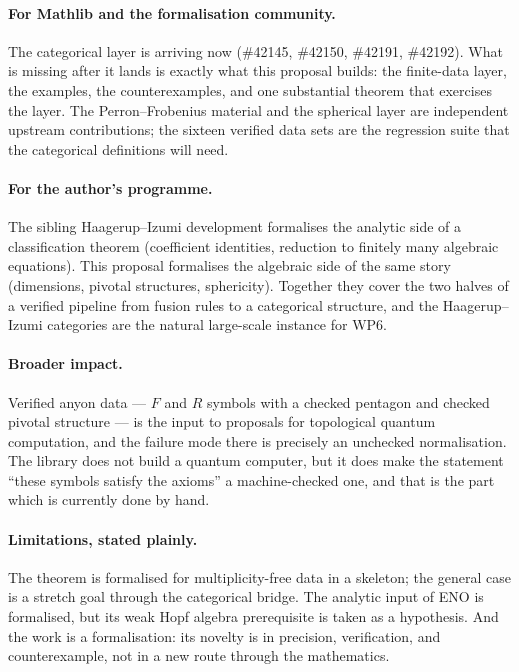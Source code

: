 \documentclass[11pt,a4paper]{article}
\theoremstyle{remark}
\begin{document}
\paragraph{For Mathlib and the formalisation community.} The categorical layer is arriving now
(\#42145, \#42150, \#42191, \#42192). What is missing after it lands is exactly what this
proposal builds: the finite-data layer, the examples, the counterexamples, and one substantial
theorem that exercises the layer. The Perron--Frobenius material and the spherical layer are
independent upstream contributions; the sixteen verified data sets are the regression suite that
the categorical definitions will need.

\paragraph{For the author's programme.} The sibling Haagerup--Izumi development formalises the
analytic side of a classification theorem (coefficient identities, reduction to finitely many
algebraic equations). This proposal formalises the algebraic side of the same story
(dimensions, pivotal structures, sphericity). Together they cover the two halves of a verified
pipeline from fusion rules to a categorical structure, and the Haagerup--Izumi categories are the
natural large-scale instance for WP6.

\paragraph{Broader impact.} Verified anyon data --- $F$ and $R$ symbols with a checked pentagon
and checked pivotal structure --- is the input to proposals for topological quantum computation,
and the failure mode there is precisely an unchecked normalisation. The library does not build a
quantum computer, but it does make the statement ``these symbols satisfy the axioms'' a
machine-checked one, and that is the part which is currently done by hand.

\paragraph{Limitations, stated plainly.} The theorem is formalised for multiplicity-free data in
a skeleton; the general case is a stretch goal through the categorical bridge. The analytic input
of ENO is formalised, but its weak Hopf algebra prerequisite is taken as a hypothesis. And the
work is a formalisation: its novelty is in precision, verification, and counterexample, not in a
new route through the mathematics.
\end{document}
